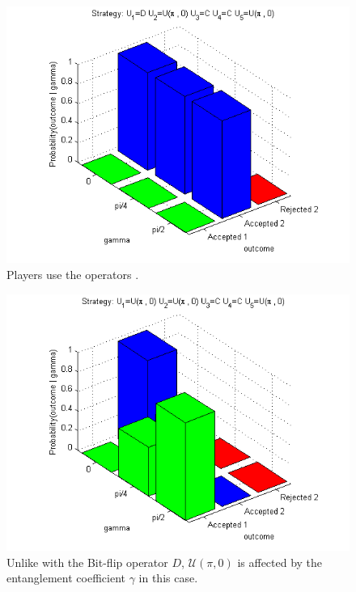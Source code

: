 \begin{figure}[h]
\centering 
\includegraphics[scale=0.80]{Figures/1.5qubit/DUpi0CCUpi0.png}
\caption{Players use the operators . }
\label{fig:pg_3players_99_0_1:2}
\end{figure}

\begin{figure}[h]
\centering 
\includegraphics[scale=0.80]{Figures/1.5qubit/Upi0Upi0CCUpi0.png}
\caption{Unlike with the Bit-flip operator $D$, $\mathcal{U} (\pi, 0)$ is affected by the entanglement coefficient $\gamma$ in this case. }
\label{fig:pg_3players_99_0_1:3}
\end{figure}




























